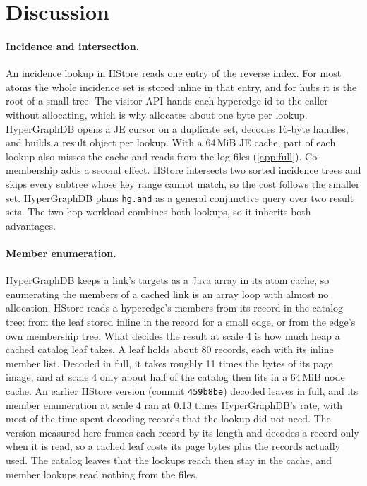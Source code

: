 \section{Discussion}
\label{sec:discussion}

\paragraph{Incidence and intersection.} An incidence lookup in HStore reads one entry of the reverse index. For most atoms the whole incidence set is stored inline in that entry, and for hubs it is the root of a small tree. The visitor API hands each hyperedge id to the caller without allocating, which is why  allocates about one byte per lookup. HyperGraphDB opens a JE cursor on a duplicate set, decodes 16-byte handles, and builds a result object per lookup. With a 64\,MiB JE cache, part of each lookup also misses the cache and reads from the log files (\cref{app:full}). Co-membership adds a second effect. HStore intersects two sorted incidence trees and skips every subtree whose key range cannot match, so the cost follows the smaller set. HyperGraphDB plans \texttt{hg.and} as a general conjunctive query over two result sets. The two-hop workload combines both lookups, so it inherits both advantages.

\paragraph{Member enumeration.} HyperGraphDB keeps a link's targets as a Java array in its atom cache, so enumerating the members of a cached link is an array loop with almost no allocation. HStore reads a hyperedge's members from its record in the catalog tree: from the leaf stored inline in the record for a small edge, or from the edge's own membership tree. What decides the result at scale 4 is how much heap a cached catalog leaf takes. A leaf holds about 80 records, each with its inline member list. Decoded in full, it takes roughly 11 times the bytes of its page image, and at scale 4 only about half of the catalog then fits in a 64\,MiB node cache. An earlier HStore version (commit \texttt{459b8be}) decoded leaves in full, and its member enumeration at scale 4 ran at 0.13 times HyperGraphDB's rate, with most of the time spent decoding records that the lookup did not need. The version measured here frames each record by its length and decodes a record only when it is read, so a cached leaf costs its page bytes plus the records actually used. The catalog leaves that the lookups reach then stay in the cache, and member lookups read nothing from the files.

